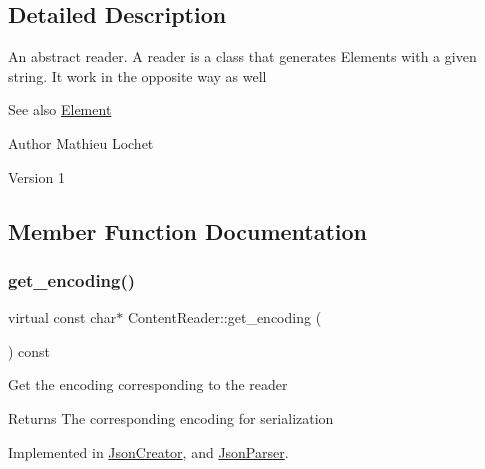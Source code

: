 \subsection{Detailed Description}
An abstract reader. A reader is a class that generates Elements with a given string. It work in the opposite way as well \begin{DoxySeeAlso}{See also}
\mbox{\hyperlink{classElement}{Element}}
\end{DoxySeeAlso}
\begin{DoxyAuthor}{Author}
Mathieu Lochet 
\end{DoxyAuthor}
\begin{DoxyVersion}{Version}
1 
\end{DoxyVersion}


\subsection{Member Function Documentation}
\mbox{\label{classContentReader_a1495a4402c4fac02d8cd2542b61c6eed}} 
\subsubsection{\texorpdfstring{get\+\_\+encoding()}{get\_encoding()}}
{\footnotesize\ttfamily virtual const char$\ast$ Content\+Reader\+::get\+\_\+encoding (\begin{DoxyParamCaption}{ }\end{DoxyParamCaption}) const\hspace{0.3cm}{\ttfamily [pure virtual]}}

Get the encoding corresponding to the reader

\begin{DoxyReturn}{Returns}
The corresponding encoding for serialization 
\end{DoxyReturn}


Implemented in \mbox{\hyperlink{classJsonCreator_ab7313de0040d40a26a9386eb3714120c}{Json\+Creator}}, and \mbox{\hyperlink{classJsonParser_a449d410175c5055eb171f00105305ec5}{Json\+Parser}}.

\mbox{\label{classContentReader_a7fff2e63a2e8fa216665604f69974e1d}} 
